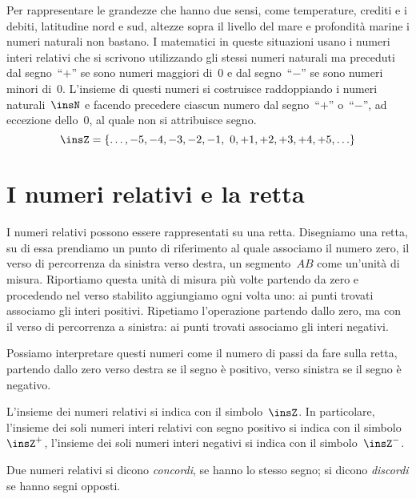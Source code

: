 Per rappresentare le grandezze che hanno due sensi, come temperature, crediti e 
i debiti, latitudine nord e sud,
altezze sopra il livello del mare e profondità marine i numeri naturali non 
bastano. I matematici in queste
situazioni usano i numeri interi relativi che si scrivono utilizzando gli stessi 
numeri naturali ma preceduti
dal segno~``\(+\)'' se sono numeri maggiori di~0 e dal segno~``\(-\)'' se sono 
numeri minori di~0. L'insieme di questi numeri
si costruisce raddoppiando i numeri naturali~\(\insN\) e facendo precedere ciascun 
numero dal segno~``\(+\)'' o~``\(-\)'',
ad eccezione dello~0, al quale non si attribuisce segno.
\[ \insZ=\lbrace\ldots,-5, -4, -3, -2, -1,~0, +1, +2, +3, +4, +5, 
\ldots\rbrace 
\]

\section{I numeri relativi e la retta}
\label{sec:02_retta}

I numeri relativi possono essere rappresentati su una retta. Disegniamo una 
retta, su di essa prendiamo
un punto di riferimento al quale associamo il numero zero, il verso di 
percorrenza da sinistra verso destra,
un segmento~\(AB\) come un'unità di misura. Riportiamo questa unità di 
misura più 
volte partendo da zero e
procedendo nel verso stabilito aggiungiamo ogni volta uno: ai punti trovati 
associamo gli interi positivi.
Ripetiamo l'operazione partendo dallo zero, ma con il verso di percorrenza 
a 
sinistra: ai punti trovati associamo
gli interi negativi.

\begin{center}
 
\end{center}

Possiamo interpretare questi numeri come il numero di passi da fare sulla 
retta, 
partendo dallo zero verso
destra se il segno è positivo, verso sinistra se il segno è negativo.

L'insieme dei numeri relativi si indica con il simbolo~\(\insZ\). In 
particolare, 
l'insieme dei soli numeri interi relativi
con segno positivo si indica con il simbolo~\(\insZ^+\),
l'insieme dei soli numeri interi negativi si indica con il 
simbolo~\(\insZ^-\).

\begin{definizione}
 Due numeri relativi si dicono \emph{concordi}, se hanno lo stesso segno; 
si 
dicono \emph{discordi} se hanno
 segni opposti.
\end{definizione}

